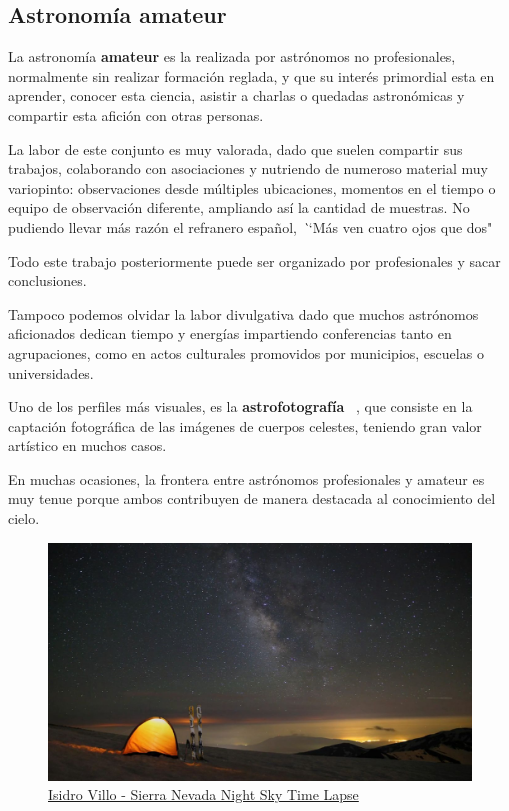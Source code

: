 \newpage

\subsection{Astronomía amateur}

La astronomía \textbf{amateur} es la realizada por astrónomos no profesionales, normalmente sin realizar formación reglada, y que su interés primordial esta en aprender, conocer esta ciencia, asistir a charlas o quedadas astronómicas y compartir esta afición con otras personas.

\bigskip
La labor de este conjunto es muy valorada, dado que suelen compartir sus trabajos, colaborando con asociaciones  y nutriendo de numeroso material muy variopinto: observaciones desde múltiples ubicaciones, momentos en el tiempo o equipo de observación diferente, ampliando así la cantidad de muestras. No pudiendo llevar más razón el refranero español, \textit``Más ven cuatro ojos que dos"

\bigskip
Todo este trabajo posteriormente puede ser organizado por profesionales y sacar conclusiones.

\bigskip
Tampoco podemos olvidar la labor divulgativa dado que muchos astrónomos aficionados dedican tiempo y energías impartiendo conferencias tanto en agrupaciones, como en actos culturales promovidos por municipios, escuelas o universidades. 

\bigskip
Uno de los perfiles más visuales, es  la \textbf{astrofotografía} ~\cite{AstroFoto}, que consiste  en la captación fotográfica de las imágenes de  cuerpos celestes, teniendo gran valor artístico en muchos casos.

\bigskip
En muchas ocasiones, la frontera entre astrónomos profesionales y amateur es muy tenue porque ambos contribuyen de manera destacada al conocimiento del cielo.


\begin{figure}
\centering
\includegraphics[width=0.7\linewidth]{../images/nightsky}
\caption{\href{https://vimeo.com/28399458}{Isidro Villo - Sierra Nevada Night Sky Time Lapse}}
\label{fig:nightsky}
\end{figure}


